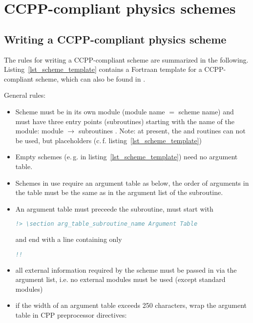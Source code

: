 \chapter{CCPP-compliant physics schemes}
\label{chap_schemes}
\setlength{\parskip}{12pt}

\section{Writing a CCPP-compliant physics scheme}
\label{sec_writescheme}
The rules for writing a CCPP-compliant scheme are summarized in the following. Listing~\ref{lst_scheme_template} contains a Fortraan template for a CCPP-compliant scheme, which can also be found in .

General rules:
\begin{itemize}
\item Scheme must be in its own module (module name $=$ scheme name) and must have three entry points (subroutines) starting with the name of the module: module  $\rightarrow$ subroutines . Note: at present, the  and  routines can not be used, but placeholders (c.\,f. listing~\ref{lst_scheme_template}) 
\item Empty schemes (e.\,g.  in listing~\ref{lst_scheme_template}) need no argument table.
\item Schemes in use require an argument table as below, the order of arguments in the table must be the same as in the argument list of the subroutine.
\item An argument table must preceede the subroutine, must start with
\begin{lstlisting}[language=Fortran]
!> \section arg_table_subroutine_name Argument Table
\end{lstlisting}
and end with a line containing only
\begin{lstlisting}[language=Fortran]
!!
\end{lstlisting}
\item all external information required by the scheme must be passed in via the argument list, i.e. no external modules must be used (except standard modules)
\item if the width of an argument table exceeds 250 characters, wrap the argument table in CPP preprocessor directives:

\end{itemize}
